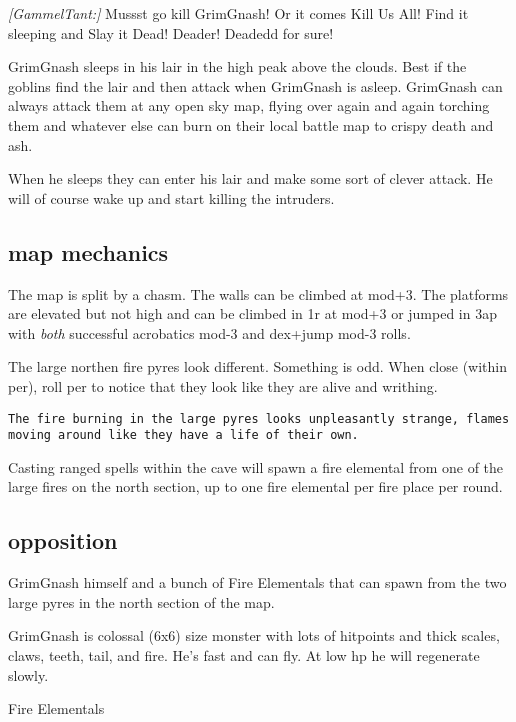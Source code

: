 \begin{readoutloud}
\emph{[GammelTant:]} Mussst go kill GrimGnash! Or it comes Kill Us All! Find it sleeping and Slay it Dead! Deader! Deadedd for sure!
\end{readoutloud}

\noindent GrimGnash sleeps in his lair in the high peak above the clouds. Best if the goblins find the lair and then attack when GrimGnash is asleep. GrimGnash can always attack them at any open sky map, flying over again and again torching them and whatever else can burn on their local battle map to crispy death and ash.

When he sleeps they can enter his lair and make some sort of clever attack. He will of course wake up and start killing the intruders.


\subsection*{map mechanics}

The map is split by a chasm. The walls can be climbed at mod+3. The platforms are elevated but not high and can be climbed in 1r at mod+3 or jumped in 3ap with \emph{both} successful acrobatics mod-3 and dex+jump mod-3 rolls. 

The large northen fire pyres look different. Something is odd. When close (within per), roll per to notice that they look like they are alive and writhing. 
\small \begin{verbatim}
The fire burning in the large pyres looks unpleasantly strange, flames moving around like they have a life of their own.
\end{verbatim} \normalsize
Casting ranged spells within the cave will spawn a fire elemental from one of the large fires on the north section, up to one fire elemental per fire place per round.


\subsection*{opposition}

GrimGnash himself and a bunch of Fire Elementals that can spawn from the two large pyres in the north section of the map.

GrimGnash is colossal (6x6) size monster with lots of hitpoints and thick scales, claws, teeth, tail, and fire. He's fast and can fly. At low hp he will regenerate slowly. 

Fire Elementals 


